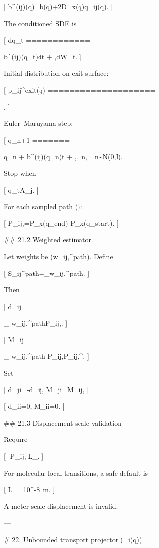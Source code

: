 [
b^{(ij)}(q)=b(q)+2D_x(q)\nabla\log q_{ij}(q).
]

The conditioned SDE is

[
\mathrm dq_t
============

b^{(ij)}(q_t)\mathrm dt
+
,\mathrm dW_t.
]

Initial distribution on exit surface:

[
p_{ij}^{\rm exit}(q)
====================

.
]

Euler–Maruyama step:

[
q_{n+1}
=======

q_n
+
b^{(ij)}(q_n)\Delta t
+
,\eta_n,
\qquad
\eta_n\sim\mathcal N(0,I).
]

Stop when

[
q_t\in A_j.
]

For each sampled path (\ell):

[
\Delta P_{ij,\ell}=P_x(q_{\rm end})-P_x(q_{\rm start}).
]

## 21.2 Weighted estimator

Let weights be (w_{ij,\ell}^{\rm path}). Define

[
S_{ij}^{\rm path}=\sum_\ell w_{ij,\ell}^{\rm path}.
]

Then

[
d_{ij}
======

\sum_\ell
w_{ij,\ell}^{\rm path}\Delta P_{ij,\ell}.
]

[
M_{ij}
======

\sum_\ell
w_{ij,\ell}^{\rm path}
\Delta P_{ij,\ell}\Delta P_{ij,\ell}^\top.
]

Set

[
d_{ji}=-d_{ij},
\qquad
M_{ji}=M_{ij},
]

[
d_{ii}=0,
\qquad
M_{ii}=0.
]

## 21.3 Displacement scale validation

Require

[
|\Delta P_{ij,\ell}|\le L_{\max}.
]

For molecular local transitions, a safe default is

[
L_{\max}=10^{-8}\ \mathrm m.
]

A meter-scale displacement is invalid.

---

# 22. Unbounded transport projector (\Pi_i(q))

